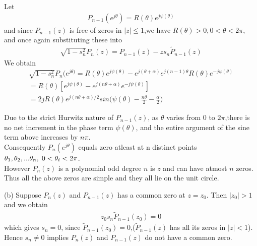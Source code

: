 \documentclass{beamer}
\begin{document}
\begin{frame}
Let 
\begin{align}
    P_{n-1}(e^{j\theta})=R(\theta)e^{j\psi(\theta)}
\end{align}
and since $P_{n-1}(z)$ is free of zeros in $|z|\leq 1$,we have $R(\theta)>0,0<\theta<2\pi$, and once again substituting these into 
\begin{align}
    \sqrt{1-s_n^2}P_n(z)=P_{n-1}(z)-z s_n\tilde{P}_{n-1}(z)
\end{align}
We obtain
\begin{align}
     \sqrt{1-s_n^2}P_n(e^{j\theta)}= R(\theta)e^{j\psi(\theta)} - e^{j(\theta+\alpha)}e^{j(n-1)\theta}R(\theta)e^{-j\psi(\theta)}\\
     =R(\theta)[e^{j\psi(\theta)}-e^{j(n\theta+\alpha)}e^{-j\psi(\theta)}]\\
     =2jR(\theta)e^{j(n\theta+\alpha)/2} sin\bigg(\psi(\theta)-\frac{n\theta}{2}-\frac{\alpha}{2} \bigg)
\end{align}
\end{frame}
\begin{frame}
Due to the strict Hurwitz nature of $P_{n-1}(z)$, as $\theta$ varies from $0$ to $2\pi$,there is no net increment in the phase term $\psi(\theta)$, and the entire argument of the sine term above increases by $n\pi$.\\
Consequently $P_n(e^{j\theta})$ equals zero atleast at n distinct points $\theta_1,\theta_2,...\theta_n,\hspace{1mm} 0<\theta_i<2\pi$.\\
However $P_n(z)$ is a polynomial odd degree $n$ is $z$ and can have atmost $n$ zeros. Thus all the above zeros are simple and they all lie on the unit circle. 
    
\end{frame}
\begin{frame}
(b)  Suppose $P_n(z)$ and $P_{n-1}(z)$ has a common zero at $z=z_0$. Then $|z_0|>1$ and we obtain
    \begin{align}
        z_0s_n\tilde{P}_{n-1}(z_0)=0
    \end{align}
which gives $s_n=0$, since $\tilde{P}_{n-1}(z_0)=0$,($\tilde{P}_{n-1}(z)$ has all its zeros in $|z|<1$).\\
Hence $s_n\neq0$ implies $P_n(z)$ and $P_{n-1}(z)$ do not have a common zero.
\end{frame}
\end{document}
